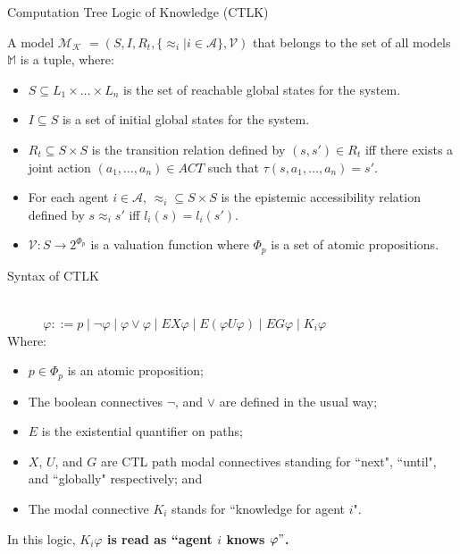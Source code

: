 \documentclass{beamer}
\begin{document}

\begin{frame}{Computation Tree Logic of Knowledge (CTLK)}
\begin{definition} \label{Model of CTLK}
A model $ \mathcal{M_K}$ $=(S,I,R_t,\{\approx_i|i\in \mathcal{ A}\}, \mathcal{V})$ that belongs to the set of all models $\mathbb{M}$ is a tuple, where:
\begin {itemize}
\item $ S \subseteq L_1 \times \dots \times L_n $ is the set of
reachable global states for the system.
\item $ I \subseteq S $ is a set of initial global states for the system.
\item $ R_t \subseteq S \times S $ is the transition relation defined by $( s,s') \in R_t $ iff there exists a joint action $( a_1, \dots , a_n) \in ACT $ such that $ \tau (s, a_1, \dots, a_n) = s'$.
\item For each agent $i \in \mathcal{A}$, $ \approx _i  \subseteq S \times S
$ is the epistemic accessibility relation defined by $ s \approx_i
s' $ iff $ l_i(s) = l_i(s') $.
\item $ \mathcal{V} : S \rightarrow 2 ^{\Phi_p} $ is a valuation function where $\Phi_p $ is a set of atomic propositions.
\end {itemize}
\label {dfn: Model of CTLK}
\end{definition}
\end{frame}
\begin{frame}{Syntax of CTLK}
\begin{definition} \label{Syntax of CTLK}~\\
$~~~~~~~~~~~~~ \varphi ::= p \mid \neg \varphi \mid \varphi \vee
\varphi \mid EX \varphi  \mid E ( \varphi U \varphi) \mid EG
\varphi \mid K_i \varphi$\\
Where:
\begin{itemize}
\item $ p \in \Phi_p$ is an atomic proposition; \item The boolean
connectives $\neg$, and $\vee$ are defined in the usual way; \item
$E$ is the existential quantifier on paths; \item $X$, $U$, and
$G$ are CTL path modal connectives standing for ``next", ``until",
and ``globally" respectively; and \item The modal connective $K_i$
stands for ``knowledge for agent $i$".
\end{itemize}
\label {dfn: Syntax of CTLK}
\end{definition}
In this logic, \textbf{$K_i \varphi$ is read as ``agent $i$ knows
$\varphi"$.}
\end{frame}
\end{document}
